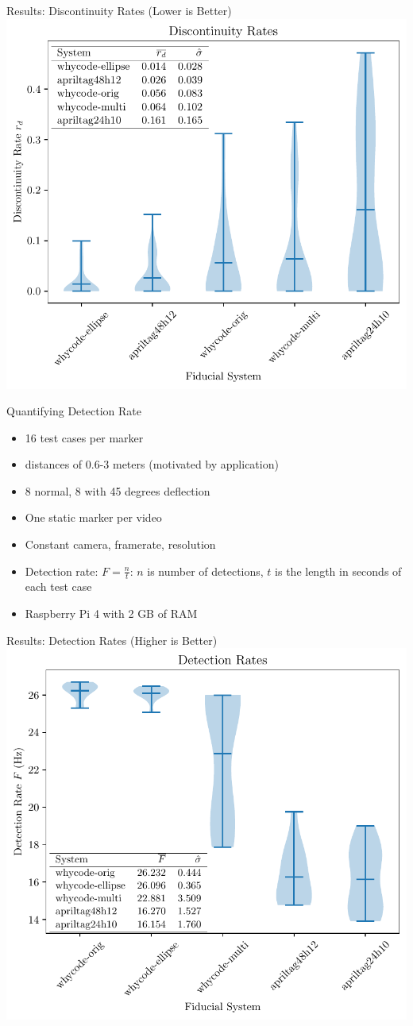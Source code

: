 \documentclass[aspectratio=169]{beamer}
\begin{document}
\begin{frame}{Results: Discontinuity Rates (Lower is Better)}
    \centering
    \includegraphics[width=0.6\linewidth]{./images/violin_plot_five_member}
\end{frame}

\begin{frame}{Quantifying Detection Rate}
	\begin{itemize}
		\item 16 test cases per marker
		\item distances of 0.6-3 meters (motivated by application)
		\item 8 normal, 8 with 45 degrees deflection
		\item One static marker per video
		\item Constant camera, framerate, resolution
		\item Detection rate: $F=\frac{n}{t}$: $n$ is number of detections, $t$ is the length in seconds of each test case
		\item Raspberry Pi 4 with 2 GB of RAM
	\end{itemize}
\end{frame}

\begin{frame}{Results: Detection Rates (Higher is Better)}
    \centering
    \includegraphics[width=0.6\linewidth]{./images/violin_plot_speed_five_member}
\end{frame}
\end{document}
